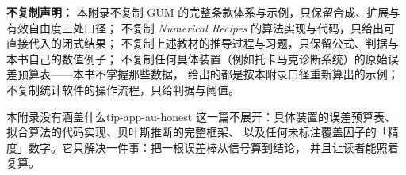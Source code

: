 \textbf{不复制声明：}
本附录不复制 GUM 的完整条款体系与示例，只保留合成、扩展与有效自由度三处口径；
不复制 \emph{Numerical Recipes} 的算法实现与代码，只给出可直接代入的闭式结果；
不复制上述教材的推导过程与习题，只保留公式、判据与本书自己的数值例子；
不复制任何具体装置（例如托卡马克诊断系统）的原始误差预算表——本书不掌握那些数据，
给出的都是按本附录口径重新算出的示例；不复制统计软件的操作流程，只给判据与阈值。

\begin{tip}{本附录没有涵盖什么}{tip-app-au-honest}
这一篇不展开：具体装置的误差预算表、拟合算法的代码实现、贝叶斯推断的完整框架、
以及任何未标注覆盖因子的「精度」数字。它只解决一件事：把一根误差棒从信号算到结论，
并且让读者能照着复算。
\end{tip}
\endgroup
